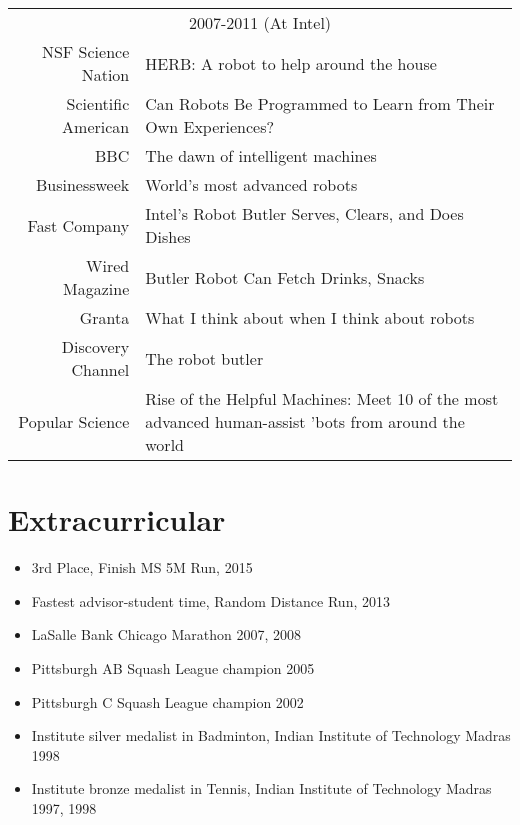 \documentclass[10pt]{article}
\begin{document}
\begin{tabularx}{\linewidth}{rX}
\multicolumn{2}{c}{2007-2011 (At Intel)}\\ 
NSF Science Nation & {HERB: A robot to help around the house}\\
Scientific American & {Can Robots Be Programmed to Learn from Their Own Experiences?}\\
BBC & {The dawn of intelligent machines}\\
Businessweek & {World's most advanced robots}\\
Fast Company & {Intel's Robot Butler Serves, Clears, and Does Dishes}\\
Wired Magazine & {Butler Robot Can Fetch Drinks, Snacks}\\
Granta & {What I think about when I think about robots}\\
Discovery Channel & {The robot butler}\\
Popular Science & {Rise of the Helpful Machines: Meet 10 of the most advanced human-assist 'bots from around the world}\\
\end{tabularx}

\section{Extracurricular}
\begin{itemize}
\addtolength{\itemsep}{-0.5\baselineskip}
\item 3rd Place, Finish MS 5M Run, 2015 
\item Fastest advisor-student time, Random Distance Run, 2013
\item LaSalle Bank Chicago Marathon 2007, 2008
\item Pittsburgh AB Squash League champion 2005
\item Pittsburgh C Squash League champion 2002
\item Institute silver medalist in Badminton, Indian Institute of Technology Madras 1998
\item Institute bronze medalist in Tennis, Indian Institute of Technology Madras 1997, 1998
\end{itemize}
\end{document}
